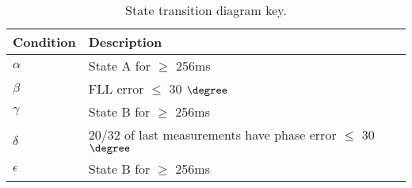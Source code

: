\begin{table}[!htb]
\centering
\begin{tabular}{|l|l|}
\hline
\rowcolor[HTML]{C0C0C0} 
Condition & Description                                                 \\ \hline
$\alpha$    & State A for  $\geq$ 256ms                                     \\ \hline
\rowcolor[HTML]{EFEFEF} 
$\beta$     & FLL error $\leq$ 30 $\degree$                                  \\ \hline
$\gamma$    & State B for $\geq$ 256ms                                      \\ \hline
\rowcolor[HTML]{EFEFEF} 
$\delta$    & 20/32 of last measurements have phase error $\leq$ 30 $\degree$ \\ \hline
$\epsilon$  & State B for $\geq$ 256ms                                      \\ \hline
\end{tabular}
\caption{State transition diagram key.}
\label{tab:StateTransitionDiagramKey}
\end{table}